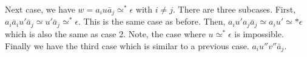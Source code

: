 \documentclass[12pt]{article}
\begin{document}
Next case, we have $w=a_iu \bar a_j \simeq^* \epsilon$ with $i \neq j$. There are three subcases. First, $a_i \bar a_i u' \bar a_j \simeq u' \bar a_j \simeq^* \epsilon$. This is the same case as before. Then, $a_iu'a_j \bar a_j \simeq a_iu' \simeq* \epsilon$ which is also the same as case 2. Note, the case where $u \simeq^* \epsilon$ is impossible. Finally we have the third case which is similar to a previous case. $a_iu''v'' \bar a_j$. 
\end{document}
